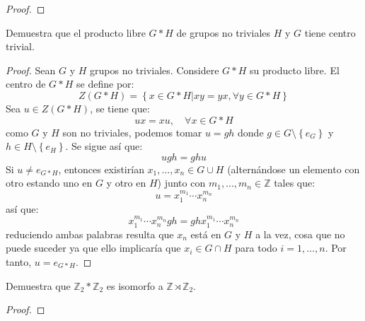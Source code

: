 \documentclass[12pt]{report}
\theoremstyle{largebreak}
\begin{document}
    \begin{proof}
        
    \end{proof}

    \begin{excer}
        Demuestra que el producto libre $G*H$ de grupos no triviales $H$ y $G$ tiene centro trivial.
    \end{excer}

    \begin{proof}
        Sean $G$ y $H$ grupos no triviales. Considere $G*H$ su producto libre. El centro de $G*H$ se define por:
        \begin{equation*}
            Z(G*H)=\left\{x\in G*H\Big|xy=yx,\forall y\in G*H \right\}
        \end{equation*}
        Sea $u\in Z(G*H)$, se tiene que:
        \begin{equation*}
            ux=xu,\quad\forall x\in G*H
        \end{equation*}
        como $G$ y $H$ son no triviales, podemos tomar $u=gh$ donde $g\in G\setminus\left\{ e_G\right\}$ y $h\in H\setminus\left\{e_H \right\}$. Se sigue así que:
        \begin{equation*}
            ugh=ghu
        \end{equation*}
        Si $u\neq e_{G*H}$, entonces existirían $x_1,...,x_n\in G\cup H$ (alternándose un elemento con otro estando uno en $G$ y otro en $H$) junto con $m_1,...,m_n\in\mathbb{Z}$ tales que:
        \begin{equation*}
            u=x_1^{ m_1}\cdots x_n^{ m_n}
        \end{equation*}
        así que:
        \begin{equation*}
            x_1^{ m_1}\cdots x_n^{ m_n}gh=ghx_1^{ m_1}\cdots x_n^{ m_n}
        \end{equation*}
        reduciendo ambas palabras resulta que $x_n$ está en $G$ y $H$ a la vez, cosa que no puede suceder ya que ello implicaría que $x_i\in G\cap H$ para todo $i=1,...,n$. Por tanto, $u=e_{G*H}$.
    \end{proof}

    \begin{excer}
        Demuestra que $\mathbb{Z}_2*\mathbb{Z}_2$ es isomorfo a $\mathbb{Z}\rtimes\mathbb{Z}_2$.
    \end{excer}

    \begin{proof}
        
    \end{proof}
\end{document}
